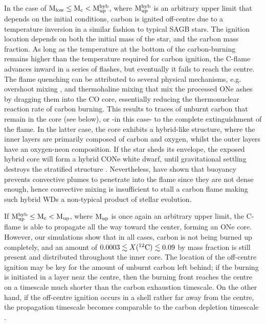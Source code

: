 \documentclass[../../main/thesis_msc.tex]{subfiles}
\begin{document}
    In the case of $\rm M_{\rm low} \leq \rm M_c < \rm M_{\rm up}^{\rm hyb}$, where $\rm M_{\rm up}^{\rm hyb}$ is an arbitrary upper limit that depends on the initial conditions, carbon is ignited off-centre due to a temperature inversion in a similar fashion to typical SAGB stars. The ignition location  depends on both the initial mass of the star, and the carbon mass fraction. As long as the temperature at the bottom of the carbon-burning remains higher than the temperature required for carbon ignition, the C-flame advances inward in a series of flashes, but eventually it fails to reach the centre. The flame quenching can be attributed to several physical mechanisms, e.g. overshoot mixing \citep{Denissenkov_2013, Chen2014, Farmer_2015}, and thermohaline mixing \citep{Siess2009} that mix the processed ONe ashes by dragging them into the CO core, essentially reducing the thermonuclear reaction rate of carbon burning. This results to traces of unburnt carbon that remain in the core (see below), or -in this case- to the complete extinguishment of the flame. In the latter case, the core exhibits a hybrid-like structure, where the inner layers are primarily composed of carbon and oxygen, whilst the outer layers have an oxygen-neon composition. If the star sheds its envelope, the exposed hybrid core will form a hybrid CONe white dwarf, until gravitational settling destroys the stratified structure \citep[see also][]{Brooks2017b, Schwab2019b}. Nevertheless, \cite{Lecoanet2016} have shown that buoyancy prevents convective plumes to penetrate into the flame since they are not dense enough, hence convective mixing is insufficient to stall a carbon flame making such hybrid WDs a non-typical product of stellar evolution.
    
    If $\rm M_{\rm up}^{\rm hyb} \leq \rm M_c < \rm M_{\rm up}$, where $\rm M_{\rm up}$ is once again an arbitrary upper limit, the C-flame is able to propagate all the way toward the center, forming an ONe core. However, our simulations show that in all cases, carbon is not being burned up completely, and an amount of $0.0003 \lesssim X(^{12}\rm C) \lesssim 0.09$ by mass fraction is still present and distributed throughout the inner core. The location of the off-centre ignition may be key for the amount of unburnt carbon left behind; if the burning is initiated in a layer near the centre, then the burning front reaches the centre on a timescale much shorter than the carbon exhaustion timescale. On the other hand, if the off-centre ignition occurs in a shell rather far away from the centre, the propagation timescale becomes comparable to the carbon depletion timescale \citep{Dominguez1993}.
    
\end{document}
